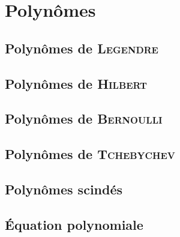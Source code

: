 \setchapterpreamble[u]{\margintoc}
\chapter{Polynômes}



\newpage

\section{Polynômes de \textsc{Legendre}} 


\section{Polynômes de \textsc{Hilbert}} 


\section{Polynômes de \textsc{Bernoulli}} 


\section{Polynômes de \textsc{Tchebychev}} 


\section{Polynômes scindés} 


\section{Équation polynomiale}  

